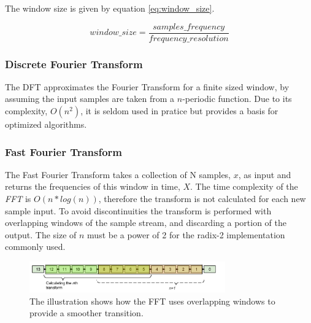 The window size is given by equation \ref{eq:window_size}.


\begin{equation} \label{eq:window_size}
window\_size = \frac{samples\_frequency}{frequency\_resolution}	
\end{equation}



\subsubsection{Discrete Fourier Transform}

The DFT approximates the Fourier Transform for a finite sized window, by assuming the 
input samples are taken from a $n$-periodic function. Due to its complexity, $O(n^2)$, 
it is seldom used in pratice but provides a basis for optimized algorithms. 

%
%			


\subsubsection{Fast Fourier Transform}\label{appendix:FFT}
The Fast Fourier Transform takes a collection of N samples, $x$, as input
and returns the frequencies of this window in time, $X$.
The time complexity of the {\it FFT} is $O(n*log(n))$, therefore the transform is not 
calculated for each new sample input. To avoid discontinuities the transform is performed 
with overlapping windows of the sample stream, and discarding a portion of the output.
The size of $n$ must be a power of 2 for the radix-2 implementation commonly used.

\begin{figure}[H]
    \centering
    \includegraphics[height=50px]{figures/theory/fft_window_overlap}
    \caption{The illustration shows how the FFT uses overlapping windows to provide a smoother transition. }
    \label{fig:fft_window_overlap}
\end{figure}

